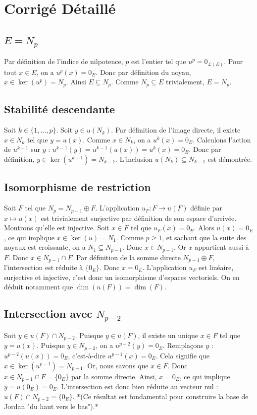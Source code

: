 \documentclass[11pt,a4paper]{article}
\begin{document}
\section{Corrigé Détaillé}

\subsection{$E = N_p$}
Par définition de l'indice de nilpotence, $p$ est l'entier tel que $u^p = 0_{\mathcal{L}(E)}$.
Pour tout $x \in E$, on a $u^p(x) = 0_E$.
Donc par définition du noyau, $x \in \ker(u^p) = N_p$. Ainsi $E \subseteq N_p$.
Comme $N_p \subseteq E$ trivialement, $E = N_p$.

\subsection{Stabilité descendante}
Soit $k \in \{1, \dots, p\}$. Soit $y \in u(N_k)$.
Par définition de l'image directe, il existe $x \in N_k$ tel que $y = u(x)$.
Comme $x \in N_k$, on a $u^k(x) = 0_E$.
Calculons l'action de $u^{k-1}$ sur $y$ :
$u^{k-1}(y) = u^{k-1}(u(x)) = u^k(x) = 0_E$.
Donc par définition, $y \in \ker(u^{k-1}) = N_{k-1}$.
L'inclusion $u(N_k) \subseteq N_{k-1}$ est démontrée.

\subsection{Isomorphisme de restriction}
Soit $F$ tel que $N_p = N_{p-1} \oplus F$.
L'application $u_F : F \to u(F)$ définie par $x \mapsto u(x)$ est trivialement surjective par définition de son espace d'arrivée.
Montrons qu'elle est injective. Soit $x \in F$ tel que $u_F(x) = 0_E$.
Alors $u(x) = 0_E$, ce qui implique $x \in \ker(u) = N_1$.
Comme $p \ge 1$, et sachant que la suite des noyaux est croissante, on a $N_1 \subseteq N_{p-1}$.
Donc $x \in N_{p-1}$.
Or $x$ appartient aussi à $F$. Donc $x \in N_{p-1} \cap F$.
Par définition de la somme directe $N_{p-1} \oplus F$, l'intersection est réduite à $\{0_E\}$.
Donc $x = 0_E$.
L'application $u_F$ est linéaire, surjective et injective, c'est donc un isomorphisme d'espaces vectoriels. On en déduit notamment que $\dim(u(F)) = \dim(F)$.

\subsection{Intersection avec $N_{p-2}$}
Soit $y \in u(F) \cap N_{p-2}$.
Puisque $y \in u(F)$, il existe un unique $x \in F$ tel que $y = u(x)$.
Puisque $y \in N_{p-2}$, on a $u^{p-2}(y) = 0_E$.
Remplaçons $y$ : $u^{p-2}(u(x)) = 0_E$, c'est-à-dire $u^{p-1}(x) = 0_E$.
Cela signifie que $x \in \ker(u^{p-1}) = N_{p-1}$.
Or, nous savons que $x \in F$.
Donc $x \in N_{p-1} \cap F = \{0_E\}$ par la somme directe.
Ainsi, $x = 0_E$, ce qui implique $y = u(0_E) = 0_E$.
L'intersection est donc bien réduite au vecteur nul : $u(F) \cap N_{p-2} = \{0_E\}$.
*(Ce résultat est fondamental pour construire la base de Jordan "du haut vers le bas").*
\end{document}
